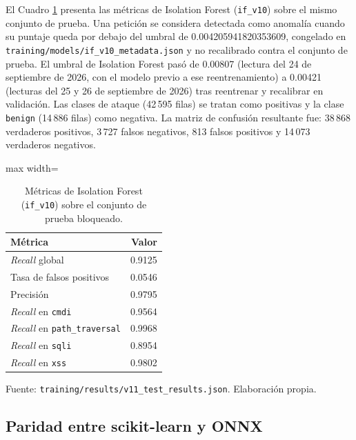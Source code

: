 El Cuadro \ref{tabla:res-if} presenta las métricas de Isolation Forest (\texttt{if\_v10}) sobre el mismo conjunto de prueba. %
Una petición se considera detectada como anomalía cuando su puntaje queda por debajo del umbral de 0.004205941820353609, congelado en \texttt{training/models/if\_v10\_metadata.json} y no recalibrado contra el conjunto de prueba. El umbral de Isolation Forest pasó de 0.00807 (lectura del 24 de septiembre de 2026, con el modelo previo a ese reentrenamiento) a 0.00421 (lecturas del 25 y 26 de septiembre de 2026) tras reentrenar y recalibrar en validación. Las clases de ataque (42\,595 filas) se tratan como positivas y la clase \texttt{benign} (14\,886 filas) como negativa. La matriz de confusión resultante fue: 38\,868 verdaderos positivos, 3\,727 falsos negativos, 813 falsos positivos y 14\,073 verdaderos negativos.

\begin{table}[htbp]
\centering
\footnotesize
\setlength{\tabcolsep}{3pt}
\begin{adjustbox}{max width=\linewidth}
\begin{tabular}{|l|r|}
\hline
\textbf{Métrica} & \textbf{Valor} \\ \hline
\textit{Recall} global & 0.9125 \\ \hline
Tasa de falsos positivos & 0.0546 \\ \hline
Precisión & 0.9795 \\ \hline
\textit{Recall} en \texttt{cmdi} & 0.9564 \\ \hline
\textit{Recall} en \texttt{path\_traversal} & 0.9968 \\ \hline
\textit{Recall} en \texttt{sqli} & 0.8954 \\ \hline
\textit{Recall} en \texttt{xss} & 0.9802 \\ \hline
\end{tabular}
\end{adjustbox}
\caption{Métricas de Isolation Forest (\texttt{if\_v10}) sobre el conjunto de prueba bloqueado.}
\label{tabla:res-if}
\par\smallskip\footnotesize Fuente: \texttt{training/results/v11\_test\_results.json}. Elaboración propia.
\end{table}

\subsection{Paridad entre scikit-learn y ONNX}


